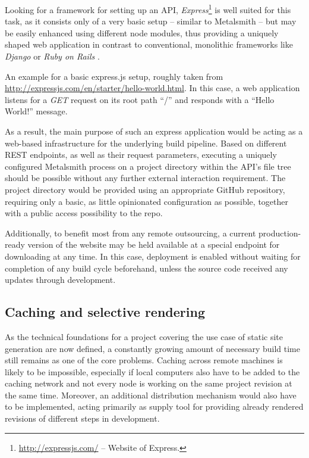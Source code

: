 Looking for a framework for setting up an API, \emph{Express}\footnote{\url{http://expressjs.com/} -- Website of Express.} is well suited for this task, as it consists only of a very basic setup -- similar to Metalsmith -- but may be easily enhanced using different node modules, thus providing a uniquely shaped web application in contrast to conventional, monolithic frameworks like \emph{Django} or \emph{Ruby on Rails} \cite[176]{cantelon2017node}.

\begin{program}
  \caption{An example for a basic express.js setup, roughly taken from \url{http://expressjs.com/en/starter/hello-world.html}. In this case, a web application listens for a \emph{GET} request on its root path ``/'' and responds with a ``Hello World!'' message.}
  \label{list:express-setup}

\end{program}

As a result, the main purpose of such an express application would be acting as a web-based infrastructure for the underlying build pipeline. Based on different REST endpoints, as well as their request parameters, executing a uniquely configured Metalsmith process on a project directory within the API's file tree should be possible without any further external interaction requirement. The project directory would be provided using an appropriate GitHub repository, requiring only a basic, as little opinionated configuration as possible, together with a public access possibility to the repo.

Additionally, to benefit most from any remote outsourcing, a current production-ready version of the website may be held available at a special endpoint for downloading at any time. In this case, deployment is enabled without waiting for completion of any build cycle beforehand, unless the source code received any updates through development.


\subsection{Caching and selective rendering}
\label{sec:primarythoughts-rendering}

As the technical foundations for a project covering the use case of static site generation are now defined, a constantly growing amount of necessary build time still remains as one of the core problems. Caching across remote machines is likely to be impossible, especially if local computers also have to be added to the caching network and not every node is working on the same project revision at the same time. Moreover, an additional distribution mechanism would also have to be implemented, acting primarily as supply tool for providing already rendered revisions of different steps in development.

